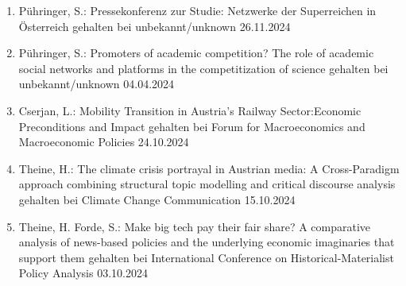 \begin{enumerate}
	\item Pühringer, S.: Pressekonferenz zur Studie: \glqq Netzwerke der Superreichen in Österreich\grqq{} gehalten bei unbekannt/unknown 26.11.2024
	\item Pühringer, S.: Promoters of academic competition? The role of academic social networks and platforms in the competitization of science gehalten bei unbekannt/unknown 04.04.2024
	\item Cserjan, L.: Mobility Transition in Austria’s Railway Sector:Economic Preconditions and Impact gehalten bei Forum for Macroeconomics and Macroeconomic Policies 24.10.2024
	\item Theine, H.: The climate crisis portrayal in Austrian media: A Cross-Paradigm approach combining structural topic modelling and critical discourse analysis gehalten bei Climate Change Communication 15.10.2024
	\item Theine, H. Forde, S.: Make big tech pay their fair share? A comparative analysis of news-based policies and the underlying economic imaginaries that support them gehalten bei International Conference on Historical-Materialist Policy Analysis 03.10.2024
\end{enumerate}
